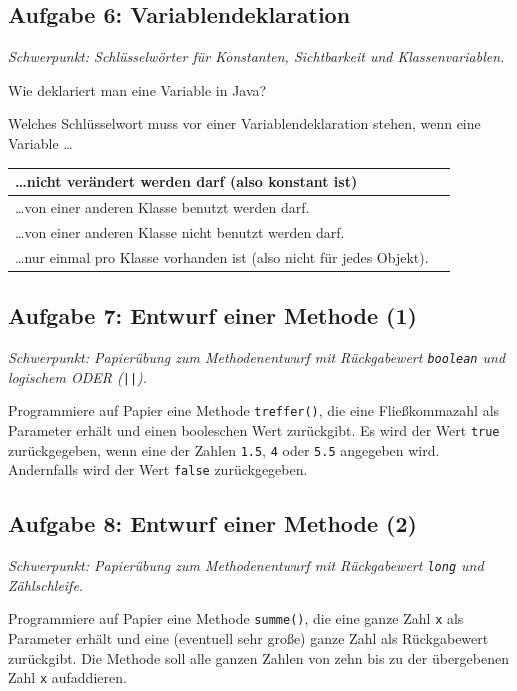 \subsection{Aufgabe 6: Variablendeklaration \tagPflicht}
\noindent \emph{Schwerpunkt: Schlüsselwörter für Konstanten, Sichtbarkeit und Klassenvariablen.}

\begin{compactenum}[a)]
\item Wie deklariert man eine Variable in Java?
\item Welches Schlüsselwort muss vor einer Variablendeklaration stehen, wenn
eine Variable \ldots

\bgroup
\def\arraystretch{1.2}
\begin{tabular}{|l|p{45mm}|}
\hline

\ldots nicht verändert werden darf (also konstant ist) & \\ \hline
\ldots von einer anderen Klasse benutzt werden darf. & \\ \hline
\ldots von einer anderen Klasse nicht benutzt werden darf. & \\ \hline
\ldots nur einmal pro Klasse vorhanden ist (also nicht für jedes Objekt). &
\\ \hline
\end{tabular}
\egroup
\end{compactenum}


\subsection{Aufgabe 7: Entwurf einer Methode (1) \tagZusatz}
\noindent \emph{Schwerpunkt: Papierübung zum Methodenentwurf mit Rückgabewert \texttt{boolean} und logischem ODER (\texttt{||}).}

Programmiere auf Papier eine Methode \lstinline|treffer()|, die eine
Fließkommazahl als Parameter erhält und einen booleschen Wert zurückgibt. Es
wird der Wert \lstinline|true| zurückgegeben, wenn eine der Zahlen
\lstinline|1.5|, \lstinline|4| oder \lstinline|5.5| angegeben wird. Andernfalls
wird der Wert \lstinline|false| zurückgegeben.


\subsection{Aufgabe 8: Entwurf einer Methode (2) \tagZusatz}
\noindent \emph{Schwerpunkt: Papierübung zum Methodenentwurf mit Rückgabewert \texttt{long} und Zählschleife.}

Programmiere auf Papier eine Methode \lstinline|summe()|, die eine ganze Zahl
\lstinline|x| als Parameter erhält und eine (eventuell sehr große) ganze Zahl
als Rückgabewert zurückgibt. Die Methode soll alle ganzen Zahlen von zehn bis zu
der übergebenen Zahl \lstinline|x| aufaddieren.


